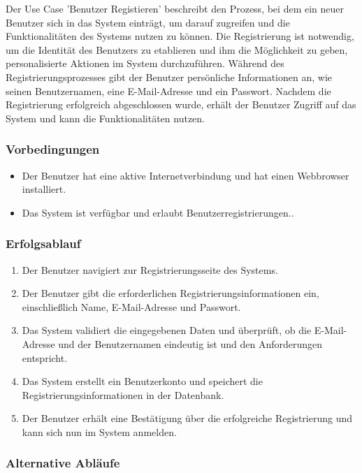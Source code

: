 Der Use Case 'Benutzer Registieren' beschreibt den Prozess, bei dem ein neuer Benutzer sich in das System einträgt, 
um darauf zugreifen und die Funktionalitäten des Systems nutzen zu können. Die Registrierung ist 
notwendig, um die Identität des Benutzers zu etablieren und ihm die Möglichkeit zu geben, 
personalisierte Aktionen im System durchzuführen. Während des Registrierungsprozesses gibt der 
Benutzer persönliche Informationen an, wie seinen Benutzernamen, eine E-Mail-Adresse und ein 
Passwort. Nachdem die Registrierung erfolgreich abgeschlossen wurde, erhält der Benutzer 
Zugriff auf das System und kann die Funktionalitäten nutzen.

\subsubsection*{Vorbedingungen}

\begin{itemize}
  \item Der Benutzer hat eine aktive Internetverbindung und hat einen Webbrowser installiert.
  \item Das System ist verfügbar und erlaubt Benutzerregistrierungen..
\end{itemize}

\subsubsection*{Erfolgsablauf}

\begin{enumerate}
  \item Der Benutzer navigiert zur Registrierungsseite des Systems.
  \item Der Benutzer gibt die erforderlichen Registrierungsinformationen ein, einschließlich Name, E-Mail-Adresse und Passwort.
  \item Das System validiert die eingegebenen Daten und überprüft, ob die E-Mail-Adresse und der Benutzernamen eindeutig ist und den Anforderungen entspricht.
  \item Das System erstellt ein Benutzerkonto und speichert die Registrierungsinformationen in der Datenbank.
  \item Der Benutzer erhält eine Bestätigung über die erfolgreiche Registrierung und kann sich nun im System anmelden.
\end{enumerate}

\subsubsection*{Alternative Abläufe}

